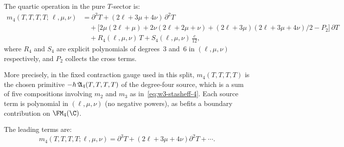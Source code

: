 \begin{theorem}
\label{thm:w3-m4-TTTT}
The quartic operation in the pure $T$-sector is:
\begin{equation}
\label{eq:w3-m4-TTTT}
\boxed{
\begin{aligned}
m_4(T,T,T,T;\,\ell,\mu,\nu)
&= \partial^3 T
 + (2\ell + 3\mu + 4\nu)\,\partial^2 T\\
&\quad + \bigl[2\mu(2\ell+\mu) + 2\nu(2\ell+2\mu+\nu) + (2\ell+3\mu)(2\ell+3\mu+4\nu)/2 - P_2\bigr]\,\partial T\\
&\quad + R_4(\ell,\mu,\nu)\, T
 + S_4(\ell,\mu,\nu)\,\tfrac{c}{12},
\end{aligned}
}
\end{equation}
where $R_4$ and $S_4$ are explicit polynomials of degrees~$3$ and~$6$
in $(\ell,\mu,\nu)$ respectively, and $P_2$ collects the cross terms.

More precisely, in the fixed contraction gauge used in this split,
$m_4(T,T,T,T)$ is the chosen primitive \(-h\,\mathfrak{A}_4(T,T,T,T)\) of
the degree-four source, which is a sum of five compositions involving
$m_2$ and $m_3$ as in~\eqref{eq:w3-stasheff-4}. Each source term is
polynomial in $(\ell,\mu,\nu)$ (no negative powers), as befits a
boundary contribution on $\FM_4(\C)$.

The leading terms are:
\begin{equation}
\label{eq:w3-m4-TTTT-leading}
m_4(T,T,T,T;\ell,\mu,\nu)
= \partial^3 T + (2\ell + 3\mu + 4\nu)\partial^2 T + \cdots.
\end{equation}
\end{theorem}

